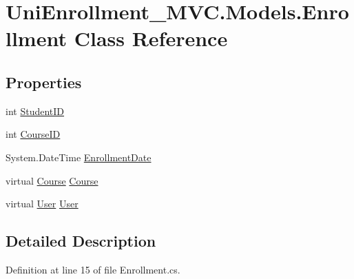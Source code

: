 \hypertarget{class_uni_enrollment___m_v_c_1_1_models_1_1_enrollment}{}\section{Uni\+Enrollment\+\_\+\+M\+V\+C.\+Models.\+Enrollment Class Reference}
\label{class_uni_enrollment___m_v_c_1_1_models_1_1_enrollment}
\subsection*{Properties}
\begin{DoxyCompactItemize}
\item 
int \hyperlink{class_uni_enrollment___m_v_c_1_1_models_1_1_enrollment_a94c4c7411d5e49898f1f9e8534a05d07}{Student\+ID}
\item 
int \hyperlink{class_uni_enrollment___m_v_c_1_1_models_1_1_enrollment_a2553a284d00f8e39de6957e3ac6e3eb4}{Course\+ID}
\item 
System.\+Date\+Time \hyperlink{class_uni_enrollment___m_v_c_1_1_models_1_1_enrollment_a717b740b6f699a2742dc5ff98aeea11f}{Enrollment\+Date}
\item 
virtual \hyperlink{class_uni_enrollment___m_v_c_1_1_models_1_1_course}{Course} \hyperlink{class_uni_enrollment___m_v_c_1_1_models_1_1_enrollment_af056ea66fa437f8a724b6f8916197160}{Course}
\item 
virtual \hyperlink{class_uni_enrollment___m_v_c_1_1_models_1_1_user}{User} \hyperlink{class_uni_enrollment___m_v_c_1_1_models_1_1_enrollment_a74c6ec4f394b98e2d676f97847a255fd}{User}
\end{DoxyCompactItemize}


\subsection{Detailed Description}


Definition at line 15 of file Enrollment.\+cs.




